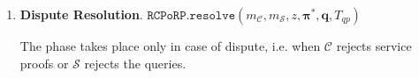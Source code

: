 \begin{enumerate}
 
  


\



\item \textbf{Dispute Resolution}. \label{RCPoRP::Dispute-Resolution} $\mathtt{RCPoRP}.\mathtt{resolve}(m_{\scriptscriptstyle \mathcal{C}},m_{\scriptscriptstyle \mathcal{S}}, z, {\bm{\pi}}^{\scriptscriptstyle *}, {\bm{q}},  T_{\scriptscriptstyle qp})$



The phase takes place only in  case of dispute, i.e. when $\mathcal C$ rejects service proofs or $\mathcal S$ rejects the queries. %

\begin{enumerate}




 
 


\end{enumerate}
\end{enumerate}
